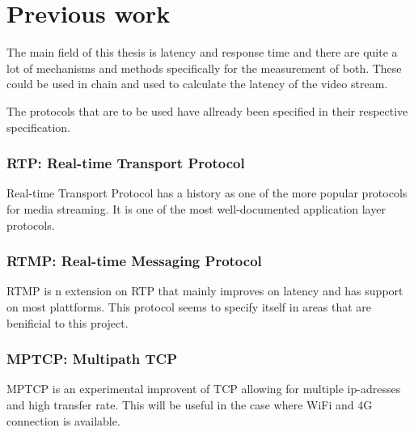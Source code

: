 \documentclass[a4paper]{article}
\begin{document}


\section{Previous work}


The main field of this thesis is latency and response time and there are quite a
lot of mechanisms and methods specifically for the measurement of both. These
could be used in chain and used to calculate the latency of the video stream.

The protocols that are to be used have allready been specified in their
respective specification.

\subsubsection*{RTP: Real-time Transport Protocol}	
Real-time Transport Protocol has a history as one of the more popular protocols
for media streaming. It is one of the most well-documented application layer
protocols. \cite{spec_RTP}

\subsubsection*{RTMP: Real-time Messaging Protocol}
RTMP is n extension on RTP that mainly improves on latency and has support on
most plattforms. This protocol seems to specify itself in areas that are
benificial to this project. \cite{spec_RTMP}

\subsubsection*{MPTCP: Multipath TCP}
MPTCP is an experimental improvent of TCP allowing for multiple ip-adresses and
high transfer rate. This will be useful in the case where	WiFi and 4G connection
is available. \cite{spec_MPTCP}
\end{document}
